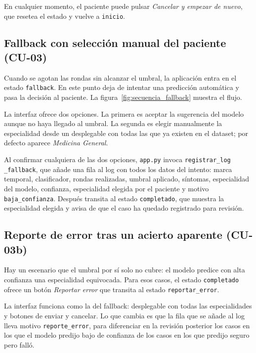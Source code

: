 En cualquier momento, el paciente puede pulsar \textit{Cancelar y empezar de nuevo}, que resetea el estado y vuelve a \texttt{inicio}.

\subsection*{Fallback con selección manual del paciente (CU-03)}

Cuando se agotan las rondas sin alcanzar el umbral, la aplicación entra en el estado \texttt{fallback}. En este punto deja de intentar una predicción automática y pasa la decisión al paciente. La figura~\ref{fig:secuencia_fallback} muestra el flujo.


La interfaz ofrece dos opciones. La primera es aceptar la sugerencia del modelo aunque no haya llegado al umbral. La segunda es elegir manualmente la especialidad desde un desplegable con todas las que ya existen en el dataset; por defecto aparece \textit{Medicina General}.

Al confirmar cualquiera de las dos opciones, \texttt{app.py} invoca \texttt{registrar\_log \_fallback}, que añade una fila al log con todos los datos del intento: marca temporal, clasificador, rondas realizadas, umbral aplicado, síntomas, especialidad del modelo, confianza, especialidad elegida por el paciente y motivo \texttt{baja\_confianza}. Después transita al estado \texttt{completado}, que muestra la especialidad elegida y avisa de que el caso ha quedado registrado para revisión.

\subsection*{Reporte de error tras un acierto aparente (CU-03b)}

Hay un escenario que el umbral por sí solo no cubre: el modelo predice con alta confianza una especialidad equivocada. Para esos casos, el estado \texttt{completado} ofrece un botón \textit{Reportar error} que transita al estado \texttt{reportar\_error}.

La interfaz funciona como la del fallback: desplegable con todas las especialidades y botones de enviar y cancelar. Lo que cambia es que la fila que se añade al log lleva motivo \texttt{reporte\_error}, para diferenciar en la revisión posterior los casos en los que el modelo predijo bajo de confianza de los casos en los que predijo seguro pero falló.

